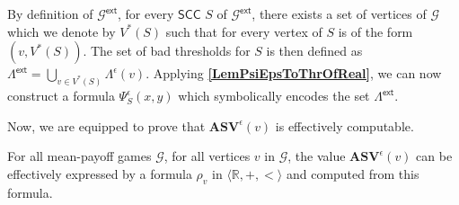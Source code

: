 By definition of $\mathcal{G}^{\mathsf{ext}}$, for every $\mathsf{SCC}$ $S$ of $\mathcal{G}^{\mathsf{ext}}$, there exists a set of vertices of $\mathcal{G}$ which we denote by $V^{*}(S)$ such that for every vertex of $S$ is of the form $(v, V^*(S))$. The set of bad thresholds for $S$ is then defined as $\Lambda^{\mathsf{ext}} = \bigcup_{v \in V^{*}(S)} \Lambda^{\epsilon}(v)$. Applying \textbf{\cref{LemPsiEpsToThrOfReal}}, we can now construct a formula $\Psi^{\epsilon}_{S}(x,y)$ which symbolically encodes the set $\Lambda^{\mathsf{ext}}$.

Now, we are equipped to prove that $\mathbf{ASV}^{\epsilon}(v)$ is effectively computable.

\begin{theorem}
\label{ThmComputeASV}
For all mean-payoff games $\mathcal{G}$, for all vertices $v$ in $\mathcal{G}$, the value $\mathbf{ASV}^{\epsilon}(v)$ can be effectively expressed by a formula $\rho_v$ in $\langle \mathbb{R}, +, < \rangle$ and computed from this formula.
\end{theorem}
